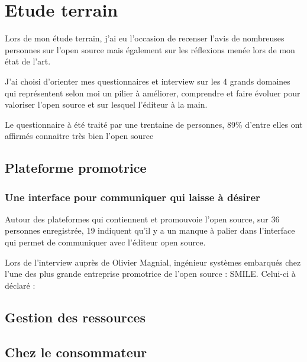 \chapter{Etude terrain} %

Lors de mon étude terrain, j'ai eu l'occasion de recenser l'avis de nombreuses personnes sur l'open source mais également sur les réflexions menée lors de mon état de l'art.

J'ai choisi d'orienter mes questionnaires et interview sur les 4 grands domaines qui représentent selon moi un pilier à améliorer, comprendre et faire évoluer pour valoriser l'open source et sur lesquel l'éditeur à la main.

Le questionnaire à été traité par une trentaine de personnes, 89\% d'entre elles ont affirmés connaitre très bien l'open source 

	\section{Plateforme promotrice}

		\subsection{Une interface pour communiquer qui laisse à désirer}

			Autour des plateformes qui contiennent et promouvoie l'open source, sur 36 personnes enregistrée, 19 indiquent qu'il y a un manque à palier dans l'interface qui permet de communiquer avec l'éditeur open source. 

			Lors de l'interview auprès de Olivier Magnial, ingénieur systèmes embarqués chez l'une des plus grande entreprise promotrice de l'open source : SMILE. Celui-ci à déclaré : 

			\begin{center}
				\textit{
				}
			\end{center}

	\section{Gestion des ressources}
	\section{Chez le consommateur}

